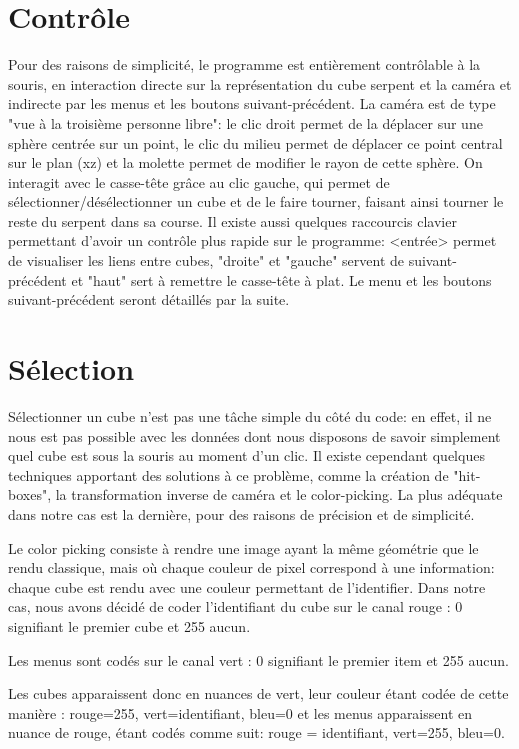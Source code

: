 \section{Contrôle}
Pour des raisons de simplicité, le programme est entièrement contrôlable à la souris, en interaction directe sur la représentation du cube serpent et la caméra et indirecte par les menus et les boutons suivant-précédent.
La caméra est de type "vue à la troisième personne libre": le clic droit permet de la déplacer sur une sphère centrée sur un point, le clic du milieu permet de déplacer ce point central sur le plan (xz) et la molette permet de modifier le rayon de cette sphère.
On interagit avec le casse-tête grâce au clic gauche, qui permet de sélectionner/désélectionner un cube et de le faire tourner, faisant ainsi tourner le reste du serpent dans sa course.
Il existe aussi quelques raccourcis clavier permettant d'avoir un contrôle plus rapide sur le programme: <entrée> permet de visualiser les liens entre cubes, "droite" et "gauche" servent de suivant-précédent et "haut" sert à remettre le casse-tête à plat.
Le menu et les boutons suivant-précédent seront détaillés par la suite.

\section{Sélection}

Sélectionner un cube n'est pas une tâche simple du côté du code: en effet, il ne nous est pas possible avec les données dont nous disposons de savoir simplement quel cube est sous la souris au moment d'un clic. Il existe cependant quelques techniques apportant des solutions à ce problème, comme la création de "hit-boxes", la transformation inverse de caméra et le color-picking. La plus adéquate dans notre cas est la dernière, pour des raisons de précision et de simplicité.

Le color picking consiste à rendre une image ayant la même géométrie que le rendu classique, mais où chaque couleur de pixel correspond à une information: chaque cube est rendu avec une couleur permettant de l'identifier. Dans notre cas, nous avons décidé de coder l'identifiant du cube sur le canal rouge : 0 signifiant le premier cube et 255 aucun.

Les menus sont codés sur le canal vert : 0 signifiant le premier item et 255 aucun.

Les cubes apparaissent donc en nuances de vert, leur couleur étant codée de cette manière : rouge=255, vert=identifiant, bleu=0 et les menus apparaissent en nuance de rouge, étant codés comme suit: rouge = identifiant, vert=255, bleu=0.

